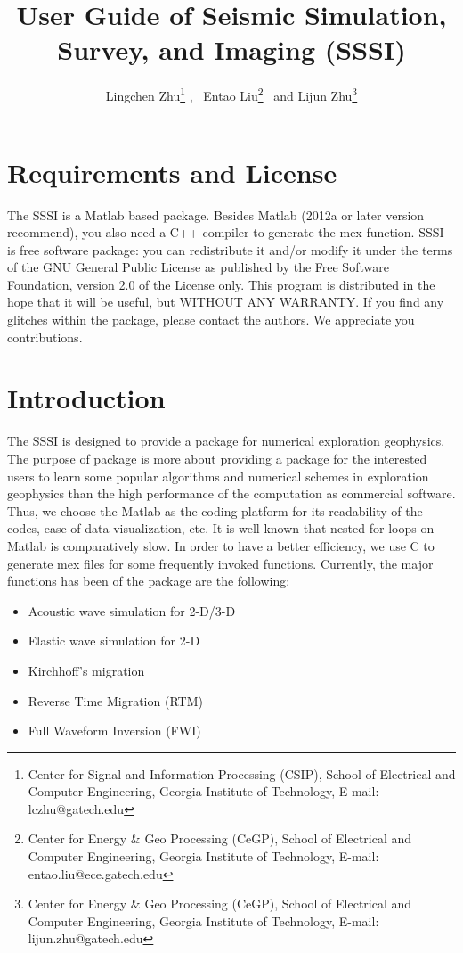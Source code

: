 \documentclass[11pt]{article}
\theoremstyle{plain}
\theoremstyle{definition}
\theoremstyle{remark}
\numberwithin{equation}{section}
\begin{document}
\title{User Guide of Seismic Simulation, Survey, and Imaging (SSSI)}
\author{Lingchen Zhu\thanks{Center for Signal and Information Processing (CSIP), School of Electrical and Computer Engineering, Georgia Institute of Technology, 
E-mail: lczhu@gatech.edu} , \, Entao Liu\thanks{Center for Energy \& Geo Processing (CeGP), School of Electrical and Computer Engineering, Georgia Institute of Technology, E-mail: entao.liu@ece.gatech.edu} \, and Lijun Zhu\thanks{Center for Energy \& Geo Processing (CeGP), School of Electrical and Computer Engineering, Georgia Institute of Technology, E-mail: lijun.zhu@gatech.edu}} \maketitle
\tableofcontents
\newpage



\section{Requirements and License}
The SSSI is a Matlab based package. Besides Matlab (2012a or later version recommend), you also need a C++ compiler to generate the mex function. 
SSSI is free software package: you can redistribute it and/or modify it under the terms of the GNU General Public License as
published by the Free Software Foundation, version 2.0 of the License only. This program is distributed in the hope that 
it will be useful, but WITHOUT ANY WARRANTY. If you find any glitches within the package, please contact the authors. 
We appreciate you contributions. 



\section{Introduction}
The SSSI is designed to provide a package for numerical exploration geophysics. The purpose of package is more about providing a package for the interested 
users to learn some popular algorithms and numerical schemes in exploration geophysics than the high performance of the computation as commercial software. 
Thus, we choose the Matlab as the coding platform for its readability of the codes, ease of data visualization, etc. It is well known that nested for-loops on Matlab 
is comparatively slow. In order to have a better efficiency, we use C to generate mex files for some frequently invoked functions.
Currently, the major functions has been of the package are the following:
\begin{itemize}
\item Acoustic wave simulation for 2-D/3-D
\item Elastic wave simulation for 2-D
\item Kirchhoff's migration
\item Reverse Time Migration (RTM)
\item Full Waveform Inversion (FWI)
\end{itemize}
\end{document}
